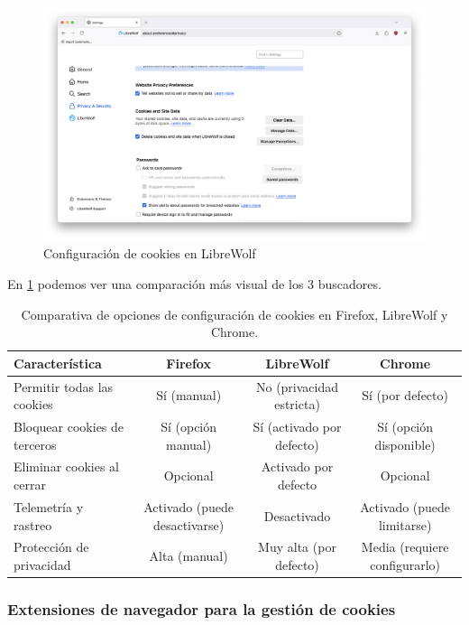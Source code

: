 \begin{figure}[H]   
    \includegraphics[width=\textwidth]{cookies_librewolf_ej14a.png}
    \caption{Configuración de cookies en LibreWolf}
    \label{fig:cookies_librewolf}
\end{figure}

En \ref{tab:comparativa-cookies} podemos ver una comparación más visual de los 3 buscadores.

\begin{table}[H]
    \centering
    \begin{tabular}{|l|c|c|c|}
    \hline
    \textbf{Característica} & \textbf{Firefox} & \textbf{LibreWolf} & \textbf{Chrome} \\ \hline
    Permitir todas las cookies & Sí (manual) & No (privacidad estricta) & Sí (por defecto) \\ \hline
    Bloquear cookies de terceros & Sí (opción manual) & Sí (activado por defecto) & Sí (opción disponible) \\ \hline
    Eliminar cookies al cerrar & Opcional & Activado por defecto & Opcional \\ \hline
    Telemetría y rastreo & Activado (puede desactivarse) & Desactivado & Activado (puede limitarse) \\ \hline
    Protección de privacidad & Alta (manual) & Muy alta (por defecto) & Media (requiere configurarlo) \\ \hline
    \end{tabular}
    \caption{Comparativa de opciones de configuración de cookies en Firefox, LibreWolf y Chrome.}
    \label{tab:comparativa-cookies}
\end{table}

\subsubsection{Extensiones de navegador para la gestión de cookies}

